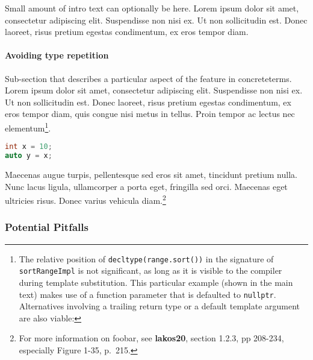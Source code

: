 \documentclass[twoside,10pt,letterpaper,usenames]{newstyle-PearsonGeneric-7-38}
\begin{document}
Small amount of intro text can optionally be here. Lorem ipsum dolor sit
amet, consectetur adipiscing elit. Suspendisse non nisi ex. Ut non
sollicitudin est. Donec laoreet, risus pretium egestas condimentum, ex
eros tempor diam.

\paragraph[Avoiding type repetition]{Avoiding type repetition}\label{avoiding-type-repetition}

Sub-section that describes a particular aspect of the feature in
concreteterms. Lorem ipsum dolor sit amet, consectetur adipiscing elit.
Suspendisse non nisi ex. Ut non sollicitudin est. Donec laoreet, risus
pretium egestas condimentum, ex eros tempor diam, quis congue nisi metus
in tellus. Proin tempor ac lectus nec elementum{\cprotect\footnote{The
relative position of \texttt{decltype(range.sort())} in the signature
of \texttt{sortRangeImpl} is not significant, as long as it is visible
to the compiler during template substitution. This particular example
(shown in the main text) makes use of a function parameter that is
defaulted to \texttt{nullptr}. Alternatives involving a trailing
return type or a default template argument are also viable:}}.

\begin{lstlisting}[language=C++]
int x = 10;
auto y = x;
\end{lstlisting}
    

Maecenas augue turpis, pellentesque sed eros sit amet, tincidunt pretium
nulla. Nunc lacus ligula, ullamcorper a porta eget, fringilla sed orci.
Maecenas eget ultricies risus. Donec varius vehicula
diam.{\cprotect\footnote{For more information on foobar, see
\textbf{lakos20}, section 1.2.3, pp 208-234, especially Figure 1-35,
p.~215.}}

\subsubsection[Potential Pitfalls]{Potential Pitfalls}\label{potential-pitfalls}
\end{document}
